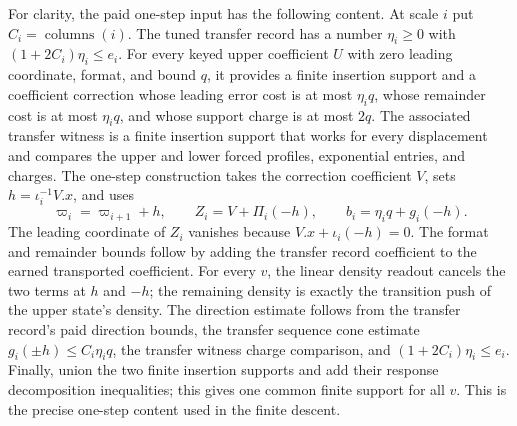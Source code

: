 For clarity, the paid one-step input has the following content. At scale
$i$ put $C_i=\operatorname{columns}(i)$. The tuned transfer record has a number
$\eta_i\geq0$ with $(1+2C_i)\eta_i\leq e_i$. For every keyed upper
coefficient $U$ with zero leading coordinate, format, and bound $q$, it
provides a finite insertion support and a coefficient correction whose leading error
cost is at most $\eta_i q$, whose remainder cost is at most $\eta_i q$,
and whose support charge is at most $2q$. The associated transfer witness is
a finite insertion support that works for every displacement and compares the upper and
lower forced profiles, exponential entries, and charges. The one-step
construction takes the correction coefficient $V$, sets
$h=\iota_i^{-1}V.x$, and uses
\[
 \varpi_i=\varpi_{i+1}+h,\qquad
 Z_i=V+\Pi_i(-h),\qquad
 b_i=\eta_i q+g_i(-h).
\]
The leading coordinate of $Z_i$ vanishes because
$V.x+\iota_i(-h)=0$. The format and remainder bounds follow by adding the
transfer record coefficient to the earned transported coefficient. For every $v$, the
linear density readout cancels the two terms at $h$ and $-h$; the remaining
density is exactly the transition push of the upper state's density. The
direction estimate follows from the transfer record's paid direction bounds, the
transfer sequence cone estimate $g_i(\pm h)\leq C_i\eta_iq$, the transfer witness charge
comparison, and $(1+2C_i)\eta_i\leq e_i$. Finally, union the two finite
insertion supports and add their response decomposition inequalities; this gives one common finite support
for all $v$. This is the precise one-step content used in the finite descent.

